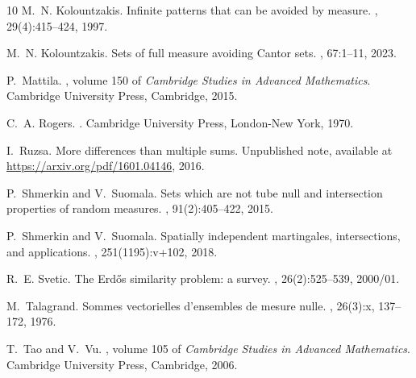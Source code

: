 \documentclass[12pt]{amsart}
\numberwithin{theorem}{section}
\numberwithin{equation}{section}
\begin{document}
\begin{thebibliography}{10}
M.~N. Kolountzakis.
\newblock Infinite patterns that can be avoided by measure.
, 29(4):415--424, 1997.

M.~N. Kolountzakis.
\newblock Sets of full measure avoiding {C}antor sets.
, 67:1--11, 2023.

P.~Mattila.
, volume 150 of {\em
  Cambridge Studies in Advanced Mathematics}.
\newblock Cambridge University Press, Cambridge, 2015.

C.~A. Rogers.
.
\newblock Cambridge University Press, London-New York, 1970.

I.~Ruzsa.
\newblock More differences than multiple sums.
\newblock Unpublished note, available at
  \url{https://arxiv.org/pdf/1601.04146}, 2016.

P.~Shmerkin and V.~Suomala.
\newblock Sets which are not tube null and intersection properties of random
  measures.
, 91(2):405--422, 2015.

P.~Shmerkin and V.~Suomala.
\newblock Spatially independent martingales, intersections, and applications.
, 251(1195):v+102, 2018.

R.~E. Svetic.
\newblock The {E}rd{\H{o}}s similarity problem: a survey.
, 26(2):525--539, 2000/01.

M.~Talagrand.
\newblock Sommes vectorielles d'ensembles de mesure nulle.
, 26(3):x, 137--172, 1976.

T.~Tao and V.~Vu.
, volume 105 of {\em Cambridge Studies in
  Advanced Mathematics}.
\newblock Cambridge University Press, Cambridge, 2006.

\end{thebibliography}


%
%
\end{document}
